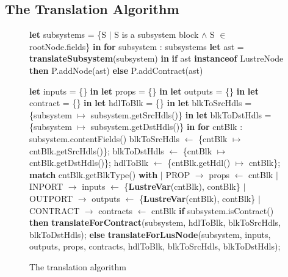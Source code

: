 \documentclass{article}
\begin{document}
\subsection{The Translation Algorithm}
\begin{figure}
\begin{algorithmic}
\State \textbf{let} subsystems = \{S $\mid$ S is a subsystem block $\land$ S $\in$ rootNode.fields\} \textbf{in}
\State \textbf{for} subsystem : subsystems
\State {\ \ \ \ } \textbf{let} ast = \textbf{translateSubsystem}(subsystem) \textbf{in}
\State {\ \ \ \ } \textbf{if}  ast \textbf{instanceof} LustreNode \textbf{then}
\State {\ \ \ \ \ \ \ \ } P.addNode(ast)
\State {\ \ \ \ } \textbf{else}
\State {\ \ \ \ \ \ \ \ } P.addContract(ast)
\EndFunction
\end{algorithmic}

\begin{algorithmic}

\State \textbf{let} inputs = \{\} \textbf{in}
\State \textbf{let} props = \{\} \textbf{in}
\State \textbf{let} outputs = \{\} \textbf{in}
\State \textbf{let} contract = \{\} \textbf{in}
\State \textbf{let} hdlToBlk = \{\} \textbf{in}
\State \textbf{let} blkToSrcHdls = \{subsystem $\mapsto$ subsystem.getSrcHdls()\} \textbf{in}
\State \textbf{let} blkToDstHdls = \{subsystem $\mapsto$ subsystem.getDstHdls()\} \textbf{in}
\State \textbf{for} cntBlk : subsystem.contentFields()
\State {\ \ \ \ }  blkToSrcHdls $\leftarrow$ \{cntBlk $\mapsto$ cntBlk.getSrcHdls()\};
\State {\ \ \ \ }  blkToDstHdls $\leftarrow$ \{cntBlk $\mapsto$ cntBlk.getDstHdls()\};
\State {\ \ \ \ } hdlToBlk $\leftarrow$ \{cntBlk.getHdl() $\mapsto$ cntBlk\};
\State {\ \ \ \ } \textbf{match}  cntBlk.getBlkType() \textbf{with}
\State {\ \ \ \ } $\mid$ PROP $\rightarrow$ props $\leftarrow$ cntBlk
\State {\ \ \ \ } $\mid$ INPORT $\rightarrow$ inputs $\leftarrow$ \{\textbf{LustreVar}(cntBlk), contBlk\}
\State {\ \ \ \ } $\mid$ OUTPORT $\rightarrow$ outputs $\leftarrow$ \{\textbf{LustreVar}(cntBlk), contBlk\}
\State {\ \ \ \ } $\mid$ CONTRACT $\rightarrow$ contracts $\leftarrow$ cntBlk
\State \textbf{if} subsystem.isContract() \textbf{then}
\State {\ \ \ \ } \textbf{translateForContract}(subsystem, hdlToBlk, blkToSrcHdls, blkToDstHdls);
\State \textbf{else}
\State {\ \ \ \ } \textbf{translateForLusNode}(subsystem, inputs, outputs, props, contracts, hdlToBlk, blkToSrcHdls, 
\State {\ \ \ \ \ \ \ \ \ \ \ \ \ \ \ \ \ \ \ \ \ \ \ \ \ \ \ \ \ \ \ \ \ \ \ \ } blkToDstHdls);
\EndFunction
\end{algorithmic}
\caption{The translation algorithm}
\end{figure}
\end{document}
